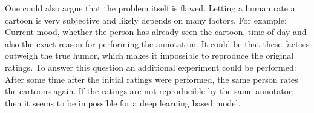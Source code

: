 \documentclass[draft,final,oneside]{vutinfth} %
\begin{document}
One could also argue that the problem itself is flawed. Letting a human rate a
cartoon is very subjective and likely depends on many factors. For example: Current mood, whether the person has already seen the cartoon, time of day and also the exact reason for performing the annotation. It could be that these factors outweigh the true humor, which makes it impossible to reproduce the original ratings. To answer this question an additional experiment could be performed: After some time after the initial ratings were performed, the same person rates the cartoons again. If the ratings are not reproducible by the same annotator, then it seems to be impossible for a deep learning based model.


\backmatter

\listoffigures %








\end{document}
